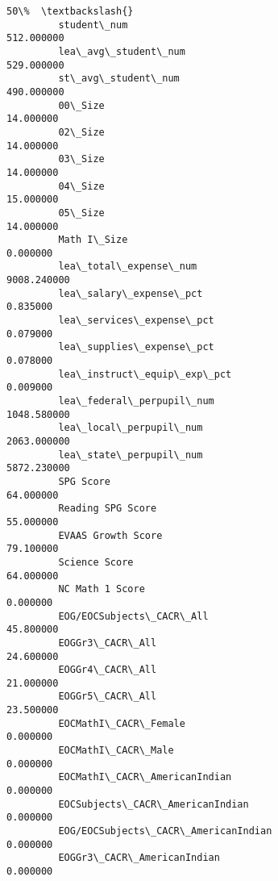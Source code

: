 \documentclass[11pt]{article}
\begin{document}
\begin{Verbatim}[commandchars=\\\{\}]
                                                                       50\%  \textbackslash{}
         student\_num                                            512.000000   
         lea\_avg\_student\_num                                    529.000000   
         st\_avg\_student\_num                                     490.000000   
         00\_Size                                                 14.000000   
         02\_Size                                                 14.000000   
         03\_Size                                                 14.000000   
         04\_Size                                                 15.000000   
         05\_Size                                                 14.000000   
         Math I\_Size                                              0.000000   
         lea\_total\_expense\_num                                 9008.240000   
         lea\_salary\_expense\_pct                                   0.835000   
         lea\_services\_expense\_pct                                 0.079000   
         lea\_supplies\_expense\_pct                                 0.078000   
         lea\_instruct\_equip\_exp\_pct                               0.009000   
         lea\_federal\_perpupil\_num                              1048.580000   
         lea\_local\_perpupil\_num                                2063.000000   
         lea\_state\_perpupil\_num                                5872.230000   
         SPG Score                                               64.000000   
         Reading SPG Score                                       55.000000   
         EVAAS Growth Score                                      79.100000   
         Science Score                                           64.000000   
         NC Math 1 Score                                          0.000000   
         EOG/EOCSubjects\_CACR\_All                                45.800000   
         EOGGr3\_CACR\_All                                         24.600000   
         EOGGr4\_CACR\_All                                         21.000000   
         EOGGr5\_CACR\_All                                         23.500000   
         EOCMathI\_CACR\_Female                                     0.000000   
         EOCMathI\_CACR\_Male                                       0.000000   
         EOCMathI\_CACR\_AmericanIndian                             0.000000   
         EOCSubjects\_CACR\_AmericanIndian                          0.000000   
         EOG/EOCSubjects\_CACR\_AmericanIndian                      0.000000   
         EOGGr3\_CACR\_AmericanIndian                               0.000000   

\end{Verbatim}
\end{document}
